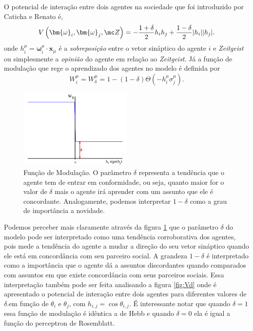 O potencial de interação entre dois agentes na sociedade que foi introduzido
por Caticha e Renato\citep{Caticha2011a} é,
\begin{equation}
V \left(\bm{\omega}_i,\bm{\omega}_j,\mc Z\right)= 
    -\frac{1 + \delta }{2}h_ih_j +\frac{ 1 -\delta}{2}|h_i||h_j|.
\label{eq:Vdelta1}
\end{equation}
onde $h_i^\mu = \bm{\omega}_i^\mu \cdot \bm{x}_\mu $  é  a
\textit{sobreposição} entre o vetor sináptico do agente $i$ e
\textit{Zeitgeist} ou simplesmente a \textit{opinião} do agente em relação
ao \textit{Zeitgeist}.  Já a função de modulação que rege o aprendizado
dos agentes no modelo é definida por
\begin{equation}
W_{i}^\mu = W_{\delta}^\mu 
= 1 -\left( 1- \delta\right)\Theta\left(-h_i^\mu\sigma_j^\mu\right).
\label{eq:W1}
\end{equation}

\begin{figure}
    \centering
    \includegraphics[width=0.5\textwidth]{Figures/fdelta}
    \caption{
      Função de Modulação. O parâmetro $\delta$ representa a tendência
      que o agente tem de entrar em conformidade, ou seja, quanto maior for
      o valor de $\delta$ mais o agente irá aprender com um assunto que
      ele é concordante.  Analogamente, podemos interpretar $1 - \delta$ como a
      grau de importância a novidade.
  } 
  \label{fig:fdelta}
\end{figure}

Podemos perceber mais claramente através da figura \ref{fig:fdelta}
que o parâmetro $\delta$ do modelo pode ser interpretado como uma tendência
corroborativa dos agentes, pois mede a tendência do agente a mudar a direção
do seu vetor sináptico quando ele está em concordância com seu parceiro
social. A grandeza $1 -\delta$ é interpretado como a importância que o agente
dá a assuntos discordantes quando comparados com assuntos em que existe
concordância com seus parceiros sociais.  Essa interpretação também pode
ser feita analisando a figura \ref{fig:Vd} onde é apresentado o potencial de
interação entre dois agentes para diferentes valores de $\delta$.em função
de $\theta_i$ e $\theta_j$, com $h_{i,j} = \cos \theta_{i,j}$.  É interessante
notar que  quando $\delta = 1$ essa função de modulação é idêntica a de
Hebb e quando $\delta = 0$ ela é igual a função do perceptron de Rosemblatt.

